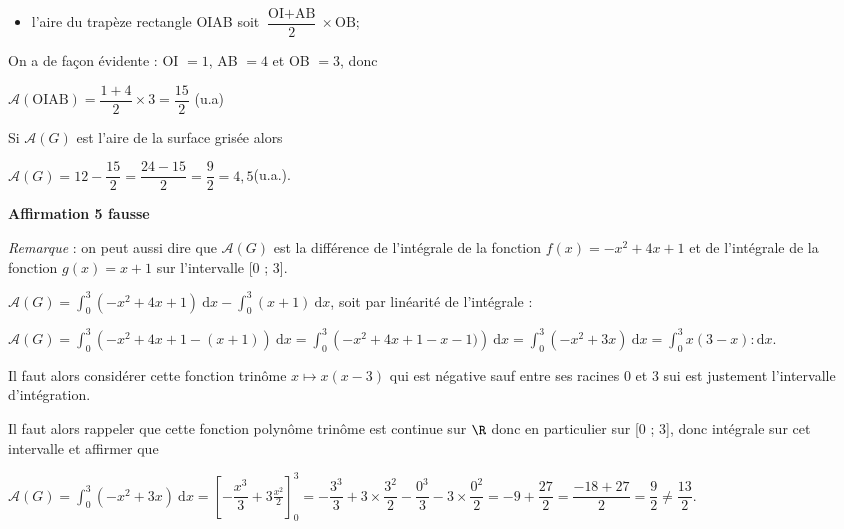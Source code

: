 \begin{enumerate}
\begin{itemize}
		\item l'aire du trapèze rectangle OIAB soit $\dfrac{\text{OI} + \text{AB}}{2}\times \text{OB}$;
		\end{itemize}

		On a de façon évidente : OI $ = 1$, \: AB $ = 4$ et OB $ =  3$, donc

		$\mathcal{A}(\text{OIAB}) = \dfrac{1 + 4} {2} \times 3 = \dfrac{15}{2}$\: (u.a)

		Si $\mathcal{A}(G)$ est l'aire de la surface grisée alors

		$\mathcal{A}(G) = 12 - \dfrac{15}{2} = \dfrac{24 - 15}{2} = \dfrac{9}{2} = 4,5$\:(u.a.).

		\hfill\textbf{Affirmation 5 fausse}

		\medskip

		\emph{Remarque} : on peut aussi dire que $\mathcal{A}(G)$  est la différence de l'intégrale de la fonction $f(x) = - x^2 + 4x + 1$ et de l'intégrale de la fonction $g(x) = x + 1$ sur l'intervalle [0 ; 3].

		$\mathcal{A}(G) = \displaystyle\int_0^3 \left(- x^2 + 4x + 1\right)\:\text{d}x - \displaystyle\int_0^3 (x + 1)\:\text{d}x$, soit par linéarité de l'intégrale :

		$\mathcal{A}(G) = \displaystyle\int_0^3 \left(- x^2 + 4x + 1 - (x + 1) \right)\:\text{d}x =
		\displaystyle\int_0^3 \left(- x^2 + 4x + 1 - x - 1) \right)\:\text{d}x = \displaystyle\int_0^3 \left(- x^2 + 3x  \right)\:\text{d}x =
		\displaystyle\int_0^3 x(3 - x) :\text{d}x$.

		Il faut alors considérer cette fonction trinôme $x \longmapsto x(x - 3)$ qui est négative sauf entre ses racines 0 et 3 sui est justement l'intervalle d'intégration.

		Il faut alors rappeler que cette fonction polynôme trinôme est continue sur $\R$ donc en particulier sur [0 ; 3], donc intégrale sur cet intervalle et affirmer que

		$\mathcal{A}(G) = \displaystyle\int_0^3 \left(- x^2 + 3x \right)\:\text{d}x = \left[- \dfrac{x^3}{3} + 3\frac{x^2}{2} \right]_0^3 = -\dfrac{3^3}{3} + 3\times \dfrac{3^2}{2} - \dfrac{0^3}{3} - 3\times \dfrac{0^2}{2}  = -9 + \dfrac{27}{2} = \dfrac{-18 + 27}{2} = \dfrac92 \ne \dfrac{13}{2}$.
\end{enumerate}
